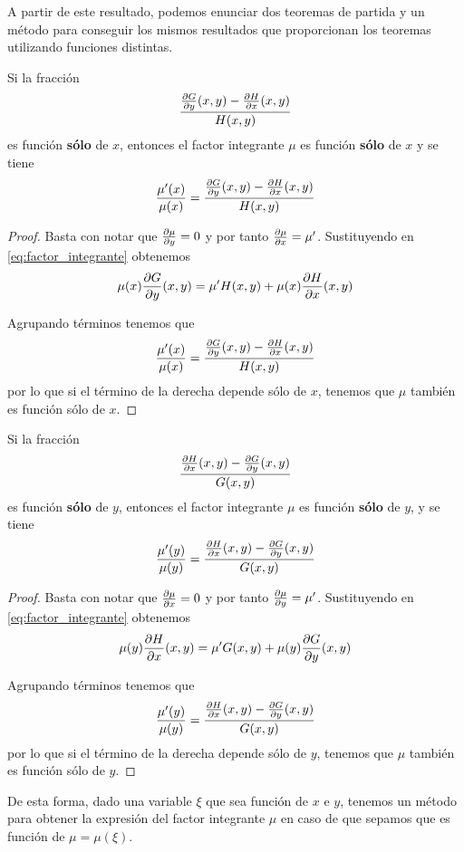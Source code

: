 A partir de este resultado, podemos enunciar dos teoremas de partida y un método para conseguir los mismos resultados que proporcionan los teoremas utilizando funciones distintas.

\begin{theorem}
Si la fracción $$\frac{\partialder{y}{G}(x,y)-\partialder{x}{H}(x,y)}{H(x,y)}$$ es función \textbf{sólo} de $x$, entonces el factor integrante $\mu$ es función \textbf{sólo} de $x$ y se tiene $$\frac{\mu^\prime(x)}{\mu(x)} = \frac{\partialder{y}{G}(x,y)-\partialder{x}{H}(x,y)}{H(x,y)}$$
\end{theorem}
\begin{proof}
Basta con notar que $\partialder{y}{\mu} = 0$ y por tanto $\partialder{x}{\mu} = \mu^\prime$.
Sustituyendo en \ref{eq:factor_integrante} obtenemos $$\mu(x)\partialder{y}{G}(x,y) = \mu^\prime H(x,y)+\mu(x) \partialder{x}{H}(x,y)$$

Agrupando términos tenemos que
$$\frac{\mu^\prime(x)}{\mu(x)} = \frac{\partialder{y}{G}(x,y)-\partialder{x}{H}(x,y)}{H(x,y)}$$
por lo que si el término de la derecha depende sólo de $x$, tenemos que $\mu$ también es función sólo de $x$.
\end{proof}

\newpage
\begin{theorem}
Si la fracción $$\frac{\partialder{x}{H}(x,y)-\partialder{y}{G}(x,y)}{G(x,y)}$$ es función \textbf{sólo} de $y$, entonces el factor integrante $\mu$ es función \textbf{sólo} de $y$, y se tiene
$$\frac{\mu^\prime(y)}{\mu(y)} = \frac{\partialder{x}{H}(x,y)-\partialder{y}{G}(x,y)}{G(x,y)}$$
\end{theorem}

\begin{proof}
Basta con notar que $\partialder{x}{\mu} = 0$ y por tanto $\partialder{y}{\mu} = \mu^\prime$.
Sustituyendo en \ref{eq:factor_integrante} obtenemos $$\mu(y)\partialder{x}{H}(x,y) = \mu^\prime G(x,y)+\mu(y) \partialder{y}{G}(x,y)$$

Agrupando términos tenemos que
$$\frac{\mu^\prime(y)}{\mu(y)} = \frac{\partialder{x}{H}(x,y)-\partialder{y}{G}(x,y)}{G(x,y)}$$
por lo que si el término de la derecha depende sólo de $y$, tenemos que $\mu$ también es función sólo de $y$.
\end{proof}

De esta forma, dado una variable $\xi$ que sea función de $x$ e $y$, tenemos un método para obtener la expresión del factor integrante $\mu$ en caso de que sepamos que es función de $\mu = \mu(\xi)$.

